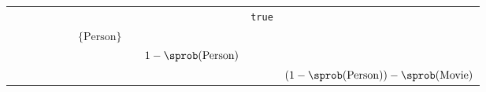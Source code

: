 \begin{table}[]
\begin{tabular}{lllllllllll}
                          &                           &                   &                                                               &                                                                                                                 &                           &                                                             &                                                                            &                                                                                          & \cellcolor[HTML]{FC8D59}\texttt{true}  &                                                                                                                 \\
                          &                           &                   &                                                               &                                                                                                                 &                           & \cellcolor[HTML]{FC8D59}$\{\text{Person}\}$                 &                                                                            &                                                                                          &                                        &                                                                                                                 \\
                          &                           &                   &                                                               &                                                                                                                 &                           &                                                             &                                                                            & \cellcolor[HTML]{FC8D59}$1 - \sprob(\text{Person})$                                      &                                        &                                                                                                                 \\
                          &                           &                   &                                                               &                                                                                                                 &                           &                                                             &                                                                            &                                                                                          &                                        & \cellcolor[HTML]{FC8D59}$(1 - \sprob(\text{Person})) - \sprob(\text{Movie})$                                    \\

\end{tabular}
\end{table}
